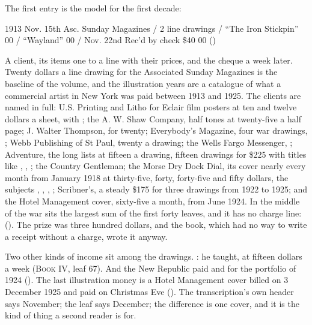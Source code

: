 The first entry is the model for the first decade:

\begin{leafquote}
1913 \quad Nov. 15th \quad Asc. Sunday Magazines / 2 line drawings / “The Iron Stickpin”  00 / “Wayland”  00 / Nov. 22nd \quad Rec'd by check \quad \$40 00 \hfill ()
\end{leafquote}

\noindent A client, its items one to a line with their prices, and the cheque a week later. Twenty dollars a line drawing for the Associated Sunday Magazines is the baseline of the volume, and the illustration years are a catalogue of what a commercial artist in New York was paid between 1913 and 1925. The clients are named in full: U.S. Printing and Litho for Eclair film posters at ten and twelve dollars a sheet, with ; the A. W. Shaw Company, half tones at twenty-five a half page; J. Walter Thompson,  for twenty; Everybody's Magazine, four war drawings, ; Webb Publishing of St Paul, twenty a drawing; the Wells Fargo Messenger, ; Adventure, the long lists at fifteen a drawing, fifteen drawings for \$225 with titles like , , ; the Country Gentleman; the Morse Dry Dock Dial, its cover nearly every month from January 1918 at thirty-five, forty, forty-five and fifty dollars, the subjects , , , ; Scribner's, a steady \$175 for three drawings from 1922 to 1925; and the Hotel Management cover, sixty-five a month, from June 1924. In the middle of the war sits the largest sum of the first forty leaves, and it has no charge line:  (). The prize was three hundred dollars, and the book, which had no way to write a receipt without a charge, wrote it anyway.

Two other kinds of income sit among the drawings. : he taught, at fifteen dollars a week (\textsc{Book IV}, leaf 67). And the New Republic paid  and  for the portfolio of 1924 (). The last illustration money is a Hotel Management cover billed on 3 December 1925 and paid on Christmas Eve (). The transcription's own header says November; the leaf says December; the difference is one cover, and it is the kind of thing a second reader is for.

